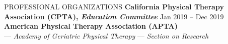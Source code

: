 \documentclass{resume} %
\begin{document}
\begin{rSection}{PROFESSIONAL ORGANIZATIONS}
\textbf{California Physical Therapy Association (CPTA), \textit{Education Committee}} \hfill{Jan 2019 -- Dec 2019}
~\\
\textbf{American Physical Therapy Association (APTA)}\\
\-\hspace{5mm} --- \textit{Academy of Geriatric Physical Therapy}
\-\hspace{5mm} --- \textit{Section on Research}
\end{rSection} 


\end{document}
